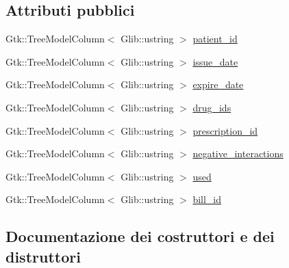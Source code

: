 \subsection*{Attributi pubblici}
\begin{DoxyCompactItemize}
\item 
Gtk\+::\+Tree\+Model\+Column$<$ Glib\+::ustring $>$ \mbox{\hyperlink{structmm_1_1model_1_1_prescription_1_1_tree_model_a814d7cb9f3f9abe35883bab3c56bc328}{patient\+\_\+id}}
\item 
Gtk\+::\+Tree\+Model\+Column$<$ Glib\+::ustring $>$ \mbox{\hyperlink{structmm_1_1model_1_1_prescription_1_1_tree_model_ab999486fd371dff7158dcf40f6ef003e}{issue\+\_\+date}}
\item 
Gtk\+::\+Tree\+Model\+Column$<$ Glib\+::ustring $>$ \mbox{\hyperlink{structmm_1_1model_1_1_prescription_1_1_tree_model_a51a87cac9a623149e021404730aed780}{expire\+\_\+date}}
\item 
Gtk\+::\+Tree\+Model\+Column$<$ Glib\+::ustring $>$ \mbox{\hyperlink{structmm_1_1model_1_1_prescription_1_1_tree_model_a57ca54db8aa2c95df49cc1c12b1ec48a}{drug\+\_\+ids}}
\item 
Gtk\+::\+Tree\+Model\+Column$<$ Glib\+::ustring $>$ \mbox{\hyperlink{structmm_1_1model_1_1_prescription_1_1_tree_model_ab9c6e53985f8fba26f6b423ba4e3e12c}{prescription\+\_\+id}}
\item 
Gtk\+::\+Tree\+Model\+Column$<$ Glib\+::ustring $>$ \mbox{\hyperlink{structmm_1_1model_1_1_prescription_1_1_tree_model_a12e1a81bee0d65dd04ab6aa7111d486b}{negative\+\_\+interactions}}
\item 
Gtk\+::\+Tree\+Model\+Column$<$ Glib\+::ustring $>$ \mbox{\hyperlink{structmm_1_1model_1_1_prescription_1_1_tree_model_abaa5eab3650e690c64385bd364526250}{used}}
\item 
Gtk\+::\+Tree\+Model\+Column$<$ Glib\+::ustring $>$ \mbox{\hyperlink{structmm_1_1model_1_1_prescription_1_1_tree_model_ac2c97db08c6a4b24f124b4c1fd8aeaf5}{bill\+\_\+id}}
\end{DoxyCompactItemize}


\subsection{Documentazione dei costruttori e dei distruttori}
\mbox{\label{structmm_1_1model_1_1_prescription_1_1_tree_model_a3b6f84fdc2b7a9f83e4c9ec7594a534d}} 
